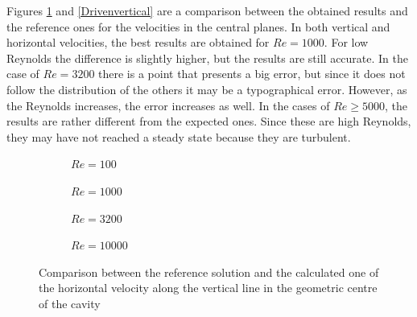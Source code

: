 Figures \ref{Drivenhorizontal} and \ref{Drivenvertical} are a comparison between the obtained results and the reference ones for the velocities in the central planes. In both vertical and horizontal velocities, the best results are obtained for $Re=1000$. For low Reynolds the difference is slightly higher, but the results are still accurate. In the case of $Re=3200$ there is a point that presents a big error, but since it does not follow the distribution of the others it may be a typographical error. However, as the Reynolds increases, the error increases as well. In the cases of $Re\geq5000$, the results are rather different from the expected ones. Since these are high Reynolds, they may have not reached a steady state because they are turbulent.
\begin{figure}[h]
	\centering
	\begin{subfigure}{0.5\textwidth}
		\resizebox{1.4\textwidth}{!}{}
		\caption{$Re=100$}
	\end{subfigure}%
	\begin{subfigure}{0.5\textwidth}
		\resizebox{1.4\textwidth}{!}{}
		\caption{$Re=1000$}
	\end{subfigure}
	\begin{subfigure}{0.5\textwidth}
		\resizebox{1.4\textwidth}{!}{}
		\caption{$Re=3200$}
	\end{subfigure}%
	\begin{subfigure}{0.5\textwidth}
		\center
		\resizebox{1.4\textwidth}{!}{}
		\caption{$Re=10000$}
	\end{subfigure}
	\caption[Comparison between the reference solution and the calculated one of the horizontal velocity along the vertical line in the geometric center of the cavity]{Comparison between the reference solution and the calculated one of the horizontal velocity along the vertical line in the geometric centre of the cavity \cite{Ghia1982}}
	\label{Drivenhorizontal}
\end{figure}

